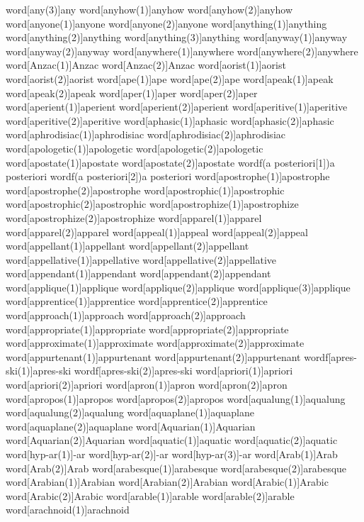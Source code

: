 word[any(3)]{any}
word[anyhow(1)]{anyhow}
word[anyhow(2)]{anyhow}
word[anyone(1)]{anyone}
word[anyone(2)]{anyone}
word[anything(1)]{anything}
word[anything(2)]{anything}
word[anything(3)]{anything}
word[anyway(1)]{anyway}
word[anyway(2)]{anyway}
word[anywhere(1)]{anywhere}
word[anywhere(2)]{anywhere}
word[Anzac(1)]{Anzac}
word[Anzac(2)]{Anzac}
word[aorist(1)]{aorist}
word[aorist(2)]{aorist}
word[ape(1)]{ape}
word[ape(2)]{ape}
word[apeak(1)]{apeak}
word[apeak(2)]{apeak}
word[aper(1)]{aper}
word[aper(2)]{aper}
word[aperient(1)]{aperient}
word[aperient(2)]{aperient}
word[aperitive(1)]{aperitive}
word[aperitive(2)]{aperitive}
word[aphasic(1)]{aphasic}
word[aphasic(2)]{aphasic}
word[aphrodisiac(1)]{aphrodisiac}
word[aphrodisiac(2)]{aphrodisiac}
word[apologetic(1)]{apologetic}
word[apologetic(2)]{apologetic}
word[apostate(1)]{apostate}
word[apostate(2)]{apostate}
wordf(a posteriori[1]){a posteriori}
wordf(a posteriori[2]){a posteriori}
word[apostrophe(1)]{apostrophe}
word[apostrophe(2)]{apostrophe}
word[apostrophic(1)]{apostrophic}
word[apostrophic(2)]{apostrophic}
word[apostrophize(1)]{apostrophize}
word[apostrophize(2)]{apostrophize}
word[apparel(1)]{apparel}
word[apparel(2)]{apparel}
word[appeal(1)]{appeal}
word[appeal(2)]{appeal}
word[appellant(1)]{appellant}
word[appellant(2)]{appellant}
word[appellative(1)]{appellative}
word[appellative(2)]{appellative}
word[appendant(1)]{appendant}
word[appendant(2)]{appendant}
word[applique(1)]{applique}
word[applique(2)]{applique}
word[applique(3)]{applique}
word[apprentice(1)]{apprentice}
word[apprentice(2)]{apprentice}
word[approach(1)]{approach}
word[approach(2)]{approach}
word[appropriate(1)]{appropriate}
word[appropriate(2)]{appropriate}
word[approximate(1)]{approximate}
word[approximate(2)]{approximate}
word[appurtenant(1)]{appurtenant}
word[appurtenant(2)]{appurtenant}
wordf[apres-ski(1)]{apres-ski}
wordf[apres-ski(2)]{apres-ski}
word[apriori(1)]{apriori}
word[apriori(2)]{apriori}
word[apron(1)]{apron}
word[apron(2)]{apron}
word[apropos(1)]{apropos}
word[apropos(2)]{apropos}
word[aqualung(1)]{aqualung}
word[aqualung(2)]{aqualung}
word[aquaplane(1)]{aquaplane}
word[aquaplane(2)]{aquaplane}
word[Aquarian(1)]{Aquarian}
word[Aquarian(2)]{Aquarian}
word[aquatic(1)]{aquatic}
word[aquatic(2)]{aquatic}
word[hyp-ar(1)]{-ar}
word[hyp-ar(2)]{-ar}
word[hyp-ar(3)]{-ar}
word[Arab(1)]{Arab}
word[Arab(2)]{Arab}
word[arabesque(1)]{arabesque}
word[arabesque(2)]{arabesque}
word[Arabian(1)]{Arabian}
word[Arabian(2)]{Arabian}
word[Arabic(1)]{Arabic}
word[Arabic(2)]{Arabic}
word[arable(1)]{arable}
word[arable(2)]{arable}
word[arachnoid(1)]{arachnoid}
